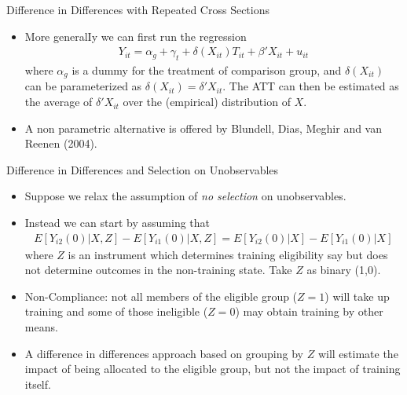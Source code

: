 \begin{frame}{Difference in Differences with Repeated Cross Sections}
\begin{itemize}
\item More generalIy we can first run the regression 
\begin{align*}
Y_{it} = \alpha_g + \gamma_t + \delta (X_{it}) T_{it} + \beta' X_{it} + u_{it}
\end{align*} 
where $\alpha_g$ is a dummy for the treatment of comparison group, and $\delta (X_{it})$ can be parameterized as $\delta(X_{it}) = \delta' X_{it}$. The ATT can then be estimated as the average of $\delta' X_{it}$ over the (empirical) distribution of $X$.
\item A non parametric alternative is offered by Blundell, Dias, Meghir and van Reenen (2004).
\end{itemize}
\end{frame}

\begin{frame}{Difference in Differences and Selection on Unobservables}
\begin{itemize}
\item Suppose we relax the assumption of \emph{no selection} on unobservables. 
\item Instead we can start by assuming that
\begin{align*}
E[Y_{i2}(0) | X,Z] - E[Y_{i1}(0) | X,Z] = E[Y_{i2}(0) | X] - E[Y_{i1}(0) | X]
\end{align*} 
where $Z$ is an instrument which determines training eligibility say but does not determine outcomes in the non-training state. Take $Z$ as binary (1,0).
\item Non-Compliance: not all members of the eligible group ($Z = 1$) will take up training and some of those ineligible ($Z = 0$) may obtain training by other means.
\item A difference in differences approach based on grouping by $Z$ will estimate the impact of being allocated to the eligible group, but not the impact of training itself.
\end{itemize}
\end{frame}

